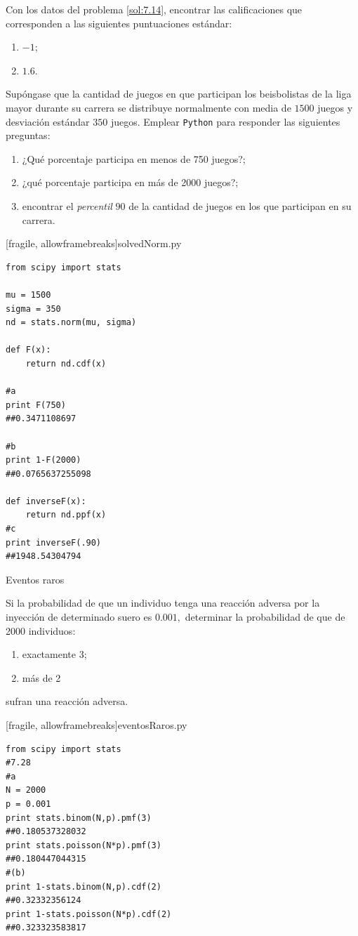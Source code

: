  \begin{ejemplo}
  \label{sol:7.15}
  Con los datos del problema \ref{sol:7.14}, encontrar las calificaciones que corresponden a las siguientes puntuaciones estándar:
  \begin{enumerate}
   \item $-1$;
   \item $1.6$.
  \end{enumerate}

 \end{ejemplo}



 \begin{ejemplo}
  \label{sol:7.16}
  Supóngase que la cantidad de juegos en que participan los beisbolistas de la liga mayor durante su carrera se distribuye normalmente con media de $1500$ juegos y desviación estándar $350$ juegos. Emplear \texttt{Python} para responder las siguientes preguntas:
  \begin{enumerate}
   \item ¿Qué porcentaje participa en menos de 750 juegos?;
   \item ¿qué porcentaje participa en más de 2000 juegos?;
   \item encontrar el \emph{percentil} $90$ de la cantidad de juegos en los que participan en su carrera.
  \end{enumerate}

 \end{ejemplo}


[fragile, allowframebreaks]{solvedNorm.py}
 \begin{verbatim}
from scipy import stats

mu = 1500
sigma = 350
nd = stats.norm(mu, sigma)

def F(x):
    return nd.cdf(x)

#a
print F(750)
##0.3471108697

#b
print 1-F(2000)
##0.0765637255098

def inverseF(x):
    return nd.ppf(x)
#c
print inverseF(.90)
##1948.54304794
 \end{verbatim}


{Eventos raros}
\begin{ejemplo}
\label{sol:7.28}
  Si la probabilidad de que un individuo tenga una reacción adversa por la inyección de determinado suero es $0.001,$ determinar la probabilidad de que de 2000 individuos:
 \begin{enumerate}
  \item exactamente 3;
  \item más de 2
 \end{enumerate}
sufran una reacción adversa.
\end{ejemplo}


[fragile, allowframebreaks]{eventosRaros.py}
 \begin{verbatim}
from scipy import stats
#7.28
#a
N = 2000
p = 0.001
print stats.binom(N,p).pmf(3)
##0.180537328032
print stats.poisson(N*p).pmf(3)
##0.180447044315
#(b)
print 1-stats.binom(N,p).cdf(2)
##0.32332356124
print 1-stats.poisson(N*p).cdf(2)
##0.323323583817
 \end{verbatim}


